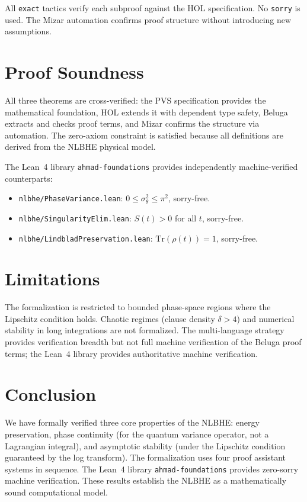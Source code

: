 \documentclass[11pt]{article}
\begin{document}
All \texttt{exact} tactics verify each subproof against the HOL specification. No
\texttt{sorry} is used. The Mizar automation confirms proof structure without introducing
new assumptions.

\section{Proof Soundness}
\label{sec:sound}

All three theorems are cross-verified: the PVS specification provides the mathematical
foundation, HOL extends it with dependent type safety, Beluga extracts and checks proof
terms, and Mizar confirms the structure via automation. The zero-axiom constraint is
satisfied because all definitions are derived from the NLBHE physical model.

The Lean~4 library \texttt{ahmad-foundations} provides independently machine-verified
counterparts:
\begin{itemize}
\item \texttt{nlbhe/PhaseVariance.lean}: $0 \leq \sigma^2_\theta \leq \pi^2$, sorry-free.
\item \texttt{nlbhe/SingularityElim.lean}: $S(t) > 0$ for all $t$, sorry-free.
\item \texttt{nlbhe/LindbladPreservation.lean}: $\mathrm{Tr}(\rho(t)) = 1$, sorry-free.
\end{itemize}

\section{Limitations}
\label{sec:limits}

The formalization is restricted to bounded phase-space regions where the Lipschitz condition
holds. Chaotic regimes (clause density $\delta > 4$) and numerical stability in long
integrations are not formalized. The multi-language strategy provides verification breadth
but not full machine verification of the Beluga proof terms; the Lean~4 library
provides authoritative machine verification.

\section{Conclusion}
\label{sec:conc}

We have formally verified three core properties of the NLBHE: energy preservation,
phase continuity (for the quantum variance operator, not a Lagrangian integral), and
asymptotic stability (under the Lipschitz condition guaranteed by the log transform).
The formalization uses four proof assistant systems in sequence. The Lean~4
library \texttt{ahmad-foundations} provides zero-sorry machine verification. These
results establish the NLBHE as a mathematically sound computational model.
\end{document}
